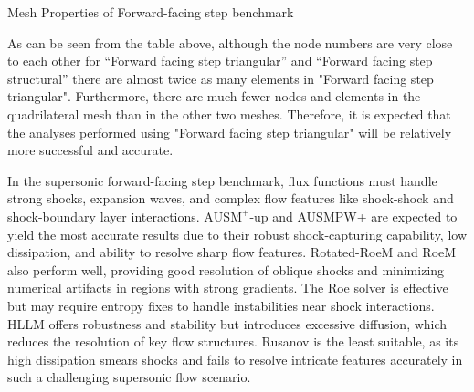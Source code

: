 \documentclass[a4paper, 12pt]{article}
\begin{document}
\begin{table}[H]
    \renewcommand\baselinestretch{1.1}\selectfont
    \centering
    \mbox{}
    \caption{ Mesh Properties of Forward-facing step benchmark}
\end{table}
As can be seen from the table above, although the node numbers are very close to each other for “Forward facing step triangular” and “Forward facing step structural” there are almost twice as many elements in "Forward facing step triangular".  Furthermore, there are much fewer nodes and elements in the quadrilateral mesh than in the other two meshes. Therefore, it is expected that the analyses performed using "Forward facing step triangular" will be relatively more successful and accurate.\\\par

In the supersonic forward-facing step benchmark, flux functions must handle strong shocks, expansion waves, and complex flow features like shock-shock and shock-boundary layer interactions. $\text{AUSM}^+\text{-up}$ and AUSMPW+ are expected to yield the most accurate results due to their robust shock-capturing capability, low dissipation, and ability to resolve sharp flow features. Rotated-RoeM and RoeM also perform well, providing good resolution of oblique shocks and minimizing numerical artifacts in regions with strong gradients. The Roe solver is effective but may require entropy fixes to handle instabilities near shock interactions. HLLM offers robustness and stability but introduces excessive diffusion, which reduces the resolution of key flow structures. Rusanov is the least suitable, as its high dissipation smears shocks and fails to resolve intricate features accurately in such a challenging supersonic flow scenario.
\end{document}

